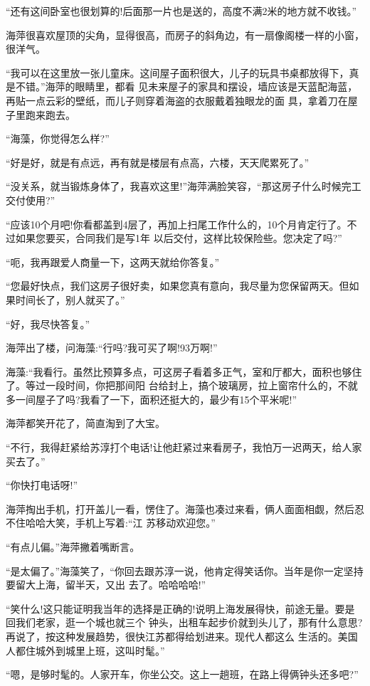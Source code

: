 \documentclass[11pt,a4paper,onecolumn]{article}
\begin{document}
``还有这间卧室也很划算的!后面那一片也是送的，高度不满2米的地方就不收钱。''

海萍很喜欢屋顶的尖角，显得很高，而房子的斜角边，有一扇像阁楼一样的小窗，很洋气。

``我可以在这里放一张儿童床。这间屋子面积很大，儿子的玩具书桌都放得下，真是不错。''海萍的眼睛里，都看
见未来屋子的家具和摆设，墙应该是天蓝配海蓝，再贴一点云彩的壁纸，而儿子则穿着海盗的衣服戴着独眼龙的面
具，拿着刀在屋子里跑来跑去。

``海藻，你觉得怎么样?''

``好是好，就是有点远，再有就是楼层有点高，六楼，天天爬累死了。''

``没关系，就当锻炼身体了，我喜欢这里!''海萍满脸笑容，``那这房子什么时候完工交付使用?''

``应该10个月吧!你看都盖到4层了，再加上扫尾工作什么的，10个月肯定行了。不过如果您要买，合同我们是写1年
以后交付，这样比较保险些。您决定了吗?''

``呃，我再跟爱人商量一下，这两天就给你答复。''

``您最好快点，我们这房子很好卖，如果您真有意向，我尽量为您保留两天。但如果时间长了，别人就买了。''

``好，我尽快答复。''

海萍出了楼，问海藻:``行吗?我可买了啊!93万啊!''

海藻:``我看行。虽然比预算多点，可这房子看着多正气，室和厅都大，面积也够住了。等过一段时间，你把那间阳
台给封上，搞个玻璃房，拉上窗帘什么的，不就多一间屋子了吗?我看了一下，面积还挺大的，最少有15个平米呢!''

海萍都笑开花了，简直淘到了大宝。

``不行，我得赶紧给苏淳打个电话!让他赶紧过来看房子，我怕万一迟两天，给人家买去了。''

``你快打电话呀!''

海萍掏出手机，打开盖儿一看，愣住了。海藻也凑过来看，俩人面面相觑，然后忍不住哈哈大笑，手机上写着:``江
苏移动欢迎您。''

``有点儿偏。''海萍撇着嘴断言。

``是太偏了。''海藻笑了，``你回去跟苏淳一说，他肯定得笑话你。当年是你一定坚持要留大上海，留半天，又出
去了。哈哈哈哈!''

``笑什么!这只能证明我当年的选择是正确的!说明上海发展得快，前途无量。要是回我们老家，逛一个城也就三个
钟头，出租车起步价就到头儿了，那有什么意思?再说了，按这种发展趋势，很快江苏都得给划进来。现代人都这么
生活的。美国人都住城外到城里上班，这叫时髦。''

``嗯，是够时髦的。人家开车，你坐公交。这上一趟班，在路上得俩钟头还多吧?''
\end{document}
